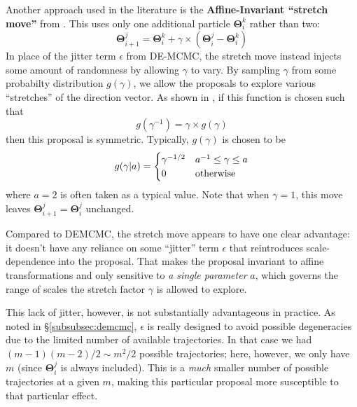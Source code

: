 \documentclass[12pt, titlepage]{article}
\newcommand{\params}{\ensuremath{\boldsymbol\Theta}}
\begin{document}
Another approach used in the literature 
\citep[e.g., {\texttt{emcee}};][]{foremanmackey+13_alt}
is the \textbf{Affine-Invariant ``stretch move''} from 
\citet{goodmanweare10}. This 
uses only one additional particle $\params_i^k$ rather than two:
\begin{equation}
    \params_{i+1}^{j} 
    = \params_i^k + \gamma \times (\params^{j}_i - \params^k_i)
\end{equation}
In place of the jitter term $\epsilon$ from DE-MCMC,
the stretch move instead injects some amount of 
randomness by allowing $\gamma$ to vary.
By sampling $\gamma$ from some probabilty distribution 
$g(\gamma)$, we allow the proposals
to explore various ``stretches'' of the direction vector.
As shown in \citet{goodmanweare10}, if this function is chosen such that
\begin{equation}
    g(\gamma^{-1}) = \gamma \times g(\gamma)
\end{equation}
then this proposal is symmetric. Typically, $g(\gamma)$ is chosen
to be
\begin{equation}
    g(\gamma|a) = 
    \begin{cases}
    \gamma^{-1/2} & a^{-1} \leq \gamma \leq a \\
    0 & {\rm otherwise}
    \end{cases}
\end{equation}
where $a=2$ is often taken as a typical value.
Note that when $\gamma = 1$, this move leaves 
$\params_{i+1}^j = \params_i^j$ unchanged.

Compared to DEMCMC, the stretch move appears to have one clear advantage:
it doesn't have any reliance on some ``jitter'' term $\epsilon$ that reintroduces
scale-dependence into the proposal. That makes the proposal invariant to
affine transformations and only
sensitive to \textit{a single parameter} $a$, which governs the range of
scales the stretch factor $\gamma$ is allowed to explore.

This lack of jitter, however, is not substantially advantageous in practice. 
As noted in \S\ref{subsubsec:demcmc},
$\epsilon$ is really designed to avoid possible
degeneracies due to the limited number of available trajectories. In that
case we had $(m-1)(m-2)/2 \sim m^2/2$ possible trajectories; here, however, we only
have $m$ (since $\params^j_i$ is always included). This is a \textit{much}
smaller number of possible trajectories at a given $m$, 
making this particular proposal more susceptible to that particular effect.
\end{document}
